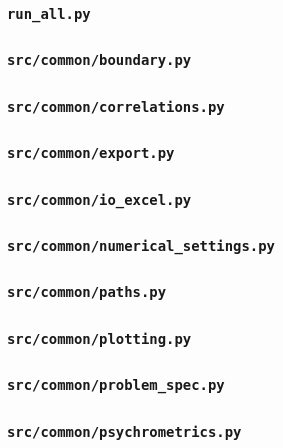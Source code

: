 \subsubsection*{\texttt{run\_all.py}}

\subsubsection*{\texttt{src/common/boundary.py}}

\subsubsection*{\texttt{src/common/correlations.py}}

\subsubsection*{\texttt{src/common/export.py}}

\subsubsection*{\texttt{src/common/io\_excel.py}}

\subsubsection*{\texttt{src/common/numerical\_settings.py}}

\subsubsection*{\texttt{src/common/paths.py}}

\subsubsection*{\texttt{src/common/plotting.py}}

\subsubsection*{\texttt{src/common/problem\_spec.py}}

\subsubsection*{\texttt{src/common/psychrometrics.py}}

